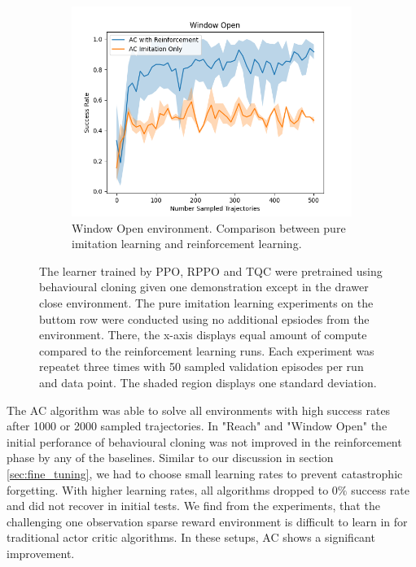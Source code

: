 \begin{figure}[htbp]
\begin{subfigure}[t]{0.45\textwidth}
      \includegraphics[width=\textwidth]{images/1_2000_imi/Window Open.png}
      \caption{Window Open environment. Comparison between pure imitation learning and reinforcement learning.}
    \end{subfigure}
    \caption{
    The learner trained by PPO, RPPO and TQC were pretrained using behavioural cloning given one demonstration except in the drawer close environment. 
    The pure imitation learning experiments on the buttom row were conducted using no additional epsiodes from the environment. There, the x-axis 
    displays equal amount of compute compared to the reinforcement learning runs.
    Each experiment was repeatet three times with 
    50 sampled validation episodes per run and data point. The shaded region displays one standard deviation.}
    \label{fig:guided_ref}
\end{figure}

The AC algorithm was able to solve all environments with high success rates after 1000 or 2000 sampled trajectories. In "Reach" and "Window Open" the initial perforance 
of behavioural cloning was not improved in the reinforcement phase by any of the baselines. Similar to our discussion in section \ref{sec:fine_tuning}, 
we had to choose small learning rates to prevent catastrophic forgetting. With higher learning rates, all algorithms dropped to $0 \%$ success rate and did 
not recover in initial tests. We find from the experiments, that the challenging one observation sparse reward environment is difficult to learn in for 
traditional actor critic algorithms. In these setups, AC shows a significant improvement.\\


